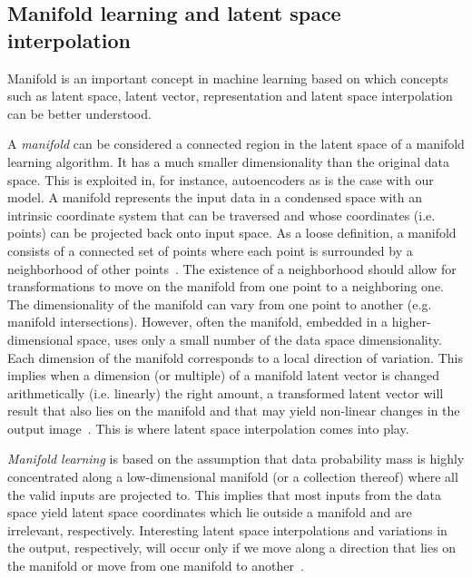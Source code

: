 \documentclass[12pt,a4paper]{article}
\begin{document}
\subsection{Manifold learning and latent space interpolation}
Manifold is an important concept in machine learning based on which concepts such as latent space, latent vector, representation and latent space interpolation can be better understood. 

A \textit{manifold} can be considered a connected region in the latent space of a manifold learning algorithm. It has a much smaller dimensionality than the original data space. This is exploited in, for instance, autoencoders as is the case with our model. A manifold represents the input data in a condensed space with an intrinsic coordinate system that can be traversed and whose coordinates (i.e. points) can be projected back onto input space. As a loose definition, a manifold consists of a connected set of points where each point is surrounded by a neighborhood of other points~\cite{DeepLearningBook}. The existence of a neighborhood should allow for transformations to move on the manifold from one point to a neighboring one. The dimensionality of the manifold can vary from one point to another (e.g. manifold intersections). However, often the manifold, embedded in a higher-dimensional space, uses only a small number of the data space dimensionality. Each dimension of the manifold corresponds to a local direction of variation. This implies when a dimension (or multiple) of a manifold latent vector is changed arithmetically (i.e. linearly) the right amount, a transformed latent vector will result that also lies on the manifold and that may yield non-linear changes in the output image~\cite{StyleGAN}. This is where latent space interpolation comes into play. 

\textit{Manifold learning} is based on the assumption that data probability mass is highly concentrated along a low-dimensional manifold (or a collection thereof) where all the valid inputs are projected to. This implies that most inputs from the data space yield latent space coordinates which lie outside a manifold and are irrelevant, respectively. Interesting latent space interpolations and variations in the output, respectively, will occur only if we move along a direction that lies on the manifold or move from one manifold to another~\cite{DeepLearningBook}.
\end{document}
